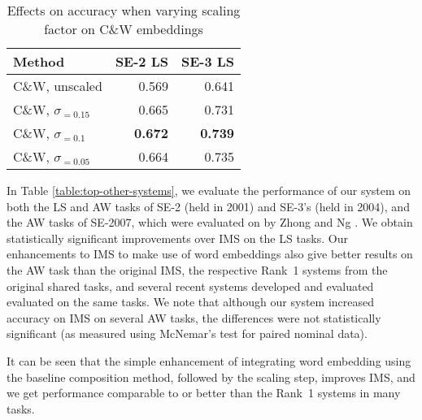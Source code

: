 \begin{table}[th]
	\caption{Effects on accuracy when varying scaling factor on C\&W embeddings}
	\label{table:wordembeddings-accuracy}
	\begin{center}
        \begin{tabular}{| l | r | r |}
			\hline
			{\bf Method} & {\bf SE-2 LS} & {\bf SE-3 LS} \\
			\hline
			C\&W, unscaled & 0.569 & 0.641 \\
			\hline
			C\&W, $\sigma _{=0.15}$ & 0.665 & 0.731 \\
			\hline
			C\&W, $\sigma _{=0.1}$ & {\bf0.672} & {\bf0.739} \\
			\hline
			C\&W, $\sigma _{=0.05}$ & 0.664 & 0.735 \\
			\hline
		\end{tabular}
	\end{center}
\end{table}

In Table \ref{table:top-other-systems}, we evaluate the performance of our system
on both the LS and AW tasks of SE-2 (held in 2001) and SE-3's (held in 2004), and the AW tasks of SE-2007, which were evaluated on by Zhong and Ng . We obtain statistically significant improvements over IMS on the LS tasks. Our enhancements to IMS to make use of word embeddings also give better results on the AW task than the original IMS, the respective Rank~1 systems from the original shared tasks, and several recent systems developed and evaluated evaluated on the same tasks. We note that although our system increased accuracy on IMS on several
AW tasks, the differences were not statistically significant 
(as measured using McNemar's test for paired nominal data). 

It can be seen that the simple enhancement of integrating word 
embedding using the baseline composition method, followed by 
the scaling step, improves IMS, and we get performance 
comparable to or better than the Rank~1 systems in many tasks.



